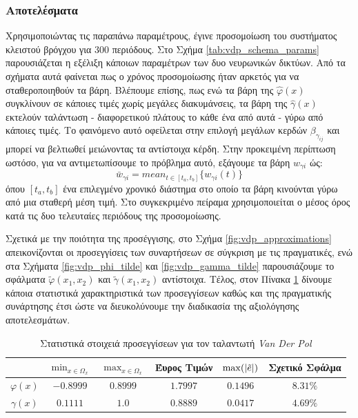 \subsubsection{Αποτελέσματα}
Χρησιμοποιώντας τις παραπάνω παραμέτρους, έγινε προσομοίωση του συστήματος κλειστού βρόγχου για $300$ περιόδους. Στο Σχήμα \ref{tab:vdp_schema_params} παρουσιάζεται η εξέλιξη κάποιων παραμέτρων των δυο νευρωνικών δικτύων. Από τα σχήματα αυτά φαίνεται πως ο χρόνος προσομοίωσης ήταν αρκετός για να σταθεροποιηθούν τα βάρη. Βλέπουμε επίσης, πως ενώ τα βάρη της $\hat{\varphi}(x)$ συγκλίνουν σε κάποιες τιμές χωρίς μεγάλες διακυμάνσεις, τα βάρη της $\hat{\gamma}(x)$ εκτελούν ταλάντωση - διαφορετικού πλάτους το κάθε ένα από αυτά - γύρω από κάποιες τιμές. Το φαινόμενο αυτό οφείλεται στην επιλογή μεγάλων κερδών $\beta_{\gamma_{ij}}$ και μπορεί να βελτιωθεί μειώνοντας τα αντίστοιχα κέρδη. Στην προκειμένη περίπτωση ωστόσο, για να αντιμετωπίσουμε το πρόβλημα αυτό, εξάγουμε τα βάρη $w_{\gamma i}$ ώς:
\begin{equation*}
	\bar{w}_{\gamma i} = mean_{t \in [t_a,t_b]} \{w_{\gamma i}(t)\}
\end{equation*}
όπου $[t_a,t_b]$ ένα επιλεγμένο χρονικό διάστημα στο οποίο τα βάρη κινούνται γύρω από μια σταθερή μέση τιμή. Στο συγκεκριμένο πείραμα χρησιμοποιείται ο μέσος όρος κατά τις δυο τελευταίες περιόδους της προσομοίωσης.

Σχετικά με την ποιότητα της προσέγγισης, στο Σχήμα \ref{fig:vdp_approximations} απεικονίζονται οι προσεγγίσεις των συναρτήσεων σε σύγκριση με τις πραγματικές, ενώ στα Σχήματα \ref{fig:vdp_phi_tilde} και \ref{fig:vdp_gamma_tilde} παρουσιάζουμε το σφάλματα $\tilde{\varphi}(x_1,x_2)$ και $\tilde{\gamma}(x_1,x_2)$ αντίστοιχα. Τέλος, στον Πίνακα \ref{tab:statistics_vdp} δίνουμε κάποια στατιστικά χαρακτηριστικά των προσεγγίσεων καθώς και της πραγματικής συνάρτησης έτσι ώστε να διευκολύνουμε την διαδικασία της αξιολόγησης αποτελεσμάτων.


\begin{table}
	\centering
	\begin{tabular}{  c | c | c | c | c | c }
		& $\min_{x \in \Omega_x}$ & $\max_{x \in \Omega_x}$ & Έυρος Τιμών & $\max(\abs{\tilde{e}})$ & Σχετικό Σφάλμα  \\ \hline \hline
		$\varphi(x)$ & $-0.8999$ & $0.8999$ & $1.7997$ & $0.1496$ & $8.31\%$ \\
		$\gamma(x)$  & $ 0.1111$ & $ 1.0$   & $0.8889$ & $0.0417$ & $4.69\%$
	\end{tabular}
	\caption{Στατιστικά στοιχειά προσεγγίσεων για τον ταλαντωτή \textit{Van Der Pol}}
	\label{tab:statistics_vdp}
\end{table}

